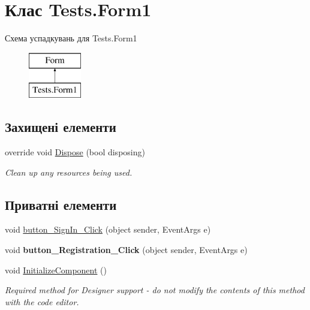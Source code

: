 \hypertarget{class_tests_1_1_form1}{}\section{Клас Tests.\+Form1}
\label{class_tests_1_1_form1}
Схема успадкувань для Tests.\+Form1\begin{figure}[H]
\begin{center}
\leavevmode
\includegraphics[height=2.000000cm]{class_tests_1_1_form1}
\end{center}
\end{figure}
\subsection*{Захищені елементи}
\begin{DoxyCompactItemize}
\item 
override void \hyperlink{class_tests_1_1_form1_ad6c795827113080b827ff5bfd3267f38}{Dispose} (bool disposing)
\begin{DoxyCompactList}\small\item\em Clean up any resources being used. \end{DoxyCompactList}\end{DoxyCompactItemize}
\subsection*{Приватні елементи}
\begin{DoxyCompactItemize}
\item 
void \hyperlink{class_tests_1_1_form1_a861240fc111a9f0c68cdc64138e1a8e3}{button\+\_\+\+Sign\+In\+\_\+\+Click} (object sender, Event\+Args e)
\item 
void {\bfseries button\+\_\+\+Registration\+\_\+\+Click} (object sender, Event\+Args e)\hypertarget{class_tests_1_1_form1_a607e53e1c4cb0f90ec5920fa5225f6bb}{}\label{class_tests_1_1_form1_a607e53e1c4cb0f90ec5920fa5225f6bb}

\item 
void \hyperlink{class_tests_1_1_form1_a66bdf3e4f89c528e5c2d6b1539db6488}{Initialize\+Component} ()
\begin{DoxyCompactList}\small\item\em Required method for Designer support -\/ do not modify the contents of this method with the code editor. \end{DoxyCompactList}\end{DoxyCompactItemize}
